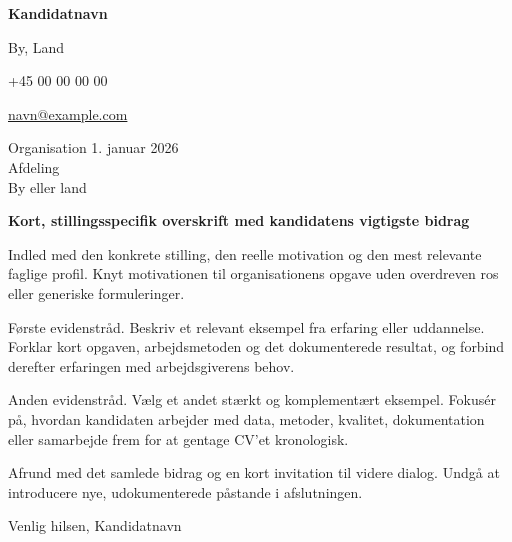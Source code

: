 \documentclass[11pt,a4paper]{article}
\begin{document}
\begin{flushleft}
{\bfseries Kandidatnavn}

By, Land

+45 00 00 00 00

\href{mailto:navn@example.com}{navn@example.com}
\end{flushleft}

\vspace{1.3em}

\begin{flushleft}
Organisation
\hfill 1. januar 2026\\
Afdeling\\
By eller land
\end{flushleft}

\vspace{1.2em}

{\Large\textbf{Kort, stillingsspecifik overskrift med kandidatens vigtigste bidrag}}

\vspace{0.8em}

Indled med den konkrete stilling, den reelle motivation og den mest relevante faglige profil. Knyt motivationen til organisationens opgave uden overdreven ros eller generiske formuleringer.

Første evidenstråd. Beskriv et relevant eksempel fra erfaring eller uddannelse. Forklar kort opgaven, arbejdsmetoden og det dokumenterede resultat, og forbind derefter erfaringen med arbejdsgiverens behov.

Anden evidenstråd. Vælg et andet stærkt og komplementært eksempel. Fokusér på, hvordan kandidaten arbejder med data, metoder, kvalitet, dokumentation eller samarbejde frem for at gentage CV'et kronologisk.

Afrund med det samlede bidrag og en kort invitation til videre dialog. Undgå at introducere nye, udokumenterede påstande i afslutningen.

\vspace{1.2em}

Venlig hilsen,
\hfill Kandidatnavn
\end{document}
